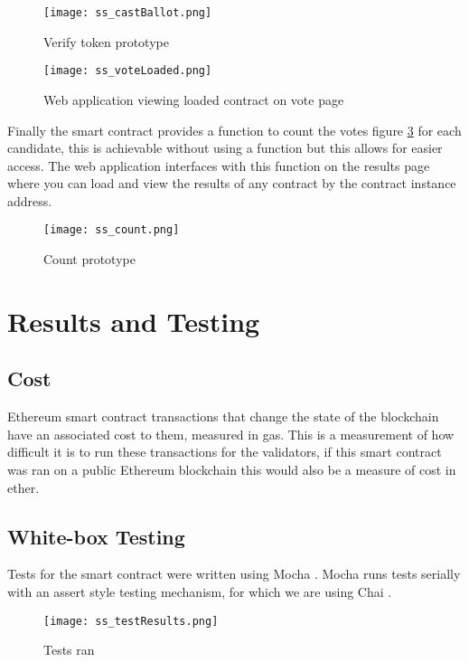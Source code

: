 \documentclass{entcs}
\begin{document}
\begin{figure}[h!]
    \centering
    \texttt{[image: ss\_castBallot.png]}
    \caption{Verify token prototype}
    \label{fig:castBallot}
\end{figure}

\begin{figure}[h!]
    \centering
    \texttt{[image: ss\_voteLoaded.png]}
    \caption{Web application viewing loaded contract on vote page}
    \label{fig:vote_loaded}
\end{figure}

Finally the smart contract provides a function to count the votes figure \ref{fig:count} for each candidate, this is achievable without using a function but this allows for easier access. The web application interfaces with this function on the results page where you can load and view the results of any contract by the contract instance address.

\begin{figure}[h!]
    \centering
    \texttt{[image: ss\_count.png]}
    \caption{Count prototype}
    \label{fig:count}
\end{figure}


\section{Results and Testing}

\subsection{Cost}
Ethereum smart contract transactions that change the state of the blockchain have an associated cost to them, measured in gas. This is a measurement of how difficult it is to run these transactions for the validators, if this smart contract was ran on a public Ethereum blockchain this would also be a measure of cost in ether.

\subsection{White-box Testing}
Tests for the smart contract were written using Mocha \cite{mocha}. Mocha runs tests serially with an assert style testing mechanism, for which we are using Chai \cite{chai}.

\begin{figure}[h!]
    \centering
    \texttt{[image: ss\_testResults.png]}
    \caption{Tests ran}
    \label{fig:testResults}
\end{figure}
\end{document}
